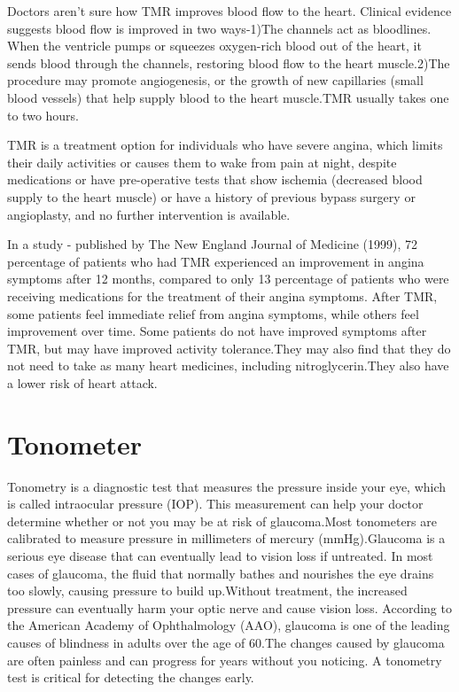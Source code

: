 \documentclass[12pt,A4paper]{article}
\begin{document}
Doctors aren't sure how TMR improves blood flow to the heart. Clinical evidence suggests blood flow is improved in two ways-1)The channels act as bloodlines. When the ventricle pumps or squeezes oxygen-rich blood out of the heart, it sends blood through the channels, restoring blood flow to the heart muscle.2)The procedure may promote angiogenesis, or the growth of new capillaries (small blood vessels) that help supply blood to the heart muscle.TMR usually takes one to two hours.

TMR is a treatment option for individuals who have severe angina, which limits their daily activities or causes them to wake from pain at night, despite medications or have pre-operative tests that show ischemia (decreased blood supply to the heart muscle) or have a history of previous bypass surgery or angioplasty, and no further intervention is available.

In a study - published by The New England Journal of Medicine (1999), 72 percentage of patients who had TMR experienced an improvement in angina symptoms after 12 months, compared to only 13 percentage of patients who were receiving medications for the treatment of their angina symptoms.
After TMR, some patients feel immediate relief from angina symptoms, while others feel improvement over time. Some patients do not have improved symptoms after TMR, but may have improved activity tolerance.They may also find that they do not need to take as many heart medicines, including nitroglycerin.They also have a lower risk of heart attack.

\newpage
\section{Tonometer}
Tonometry is a diagnostic test that measures the pressure inside your eye, which is called intraocular pressure (IOP). This measurement can help your doctor determine whether or not you may be at risk of glaucoma.Most tonometers are calibrated to measure pressure in millimeters of mercury (mmHg).Glaucoma is a serious eye disease that can eventually lead to vision loss if untreated. In most cases of glaucoma, the fluid that normally bathes and nourishes the eye drains too slowly, causing pressure to build up.Without treatment, the increased pressure can eventually harm your optic nerve and cause vision loss. According to the American Academy of Ophthalmology (AAO), glaucoma is one of the leading causes of blindness in adults over the age of 60.The changes caused by glaucoma are often painless and can progress for years without you noticing. A tonometry test is critical for detecting the changes early.
\end{document}
